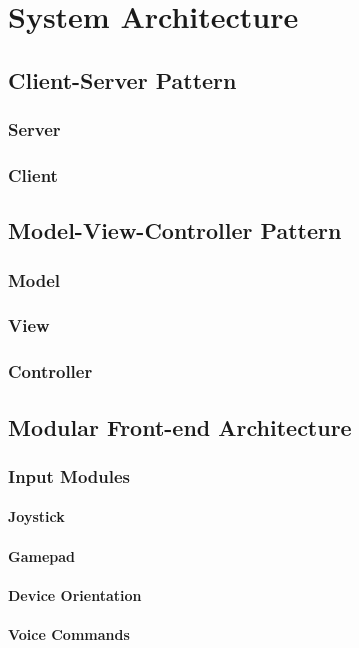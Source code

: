 \chapter{System Architecture}
\section{Client-Server Pattern}
\subsection{Server}
\subsection{Client}
\section{Model-View-Controller Pattern}
\subsection{Model}
\subsection{View}
\subsection{Controller}
\section{Modular Front-end Architecture}
\subsection{Input Modules}
\subsubsection{Joystick}
\subsubsection{Gamepad}
\subsubsection{Device Orientation}
\subsubsection{Voice Commands}
